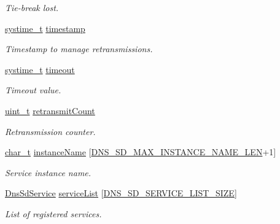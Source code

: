 \begin{DoxyCompactItemize}
\begin{DoxyCompactList}\small\item\em Tie-\/break lost. \end{DoxyCompactList}\item 
\hyperlink{compiler__port_8h_ae3e32a98d431a02106616da3071832dd}{systime\+\_\+t} \hyperlink{struct__DnsSdContext_aec4267367c8b45683171caeaeba3c342}{timestamp}
\begin{DoxyCompactList}\small\item\em Timestamp to manage retransmissions. \end{DoxyCompactList}\item 
\hyperlink{compiler__port_8h_ae3e32a98d431a02106616da3071832dd}{systime\+\_\+t} \hyperlink{struct__DnsSdContext_ab0cfde919cfcd7ebe5d15d2d1effba21}{timeout}
\begin{DoxyCompactList}\small\item\em Timeout value. \end{DoxyCompactList}\item 
\hyperlink{compiler__port_8h_a12a1e9b3ce141648783a82445d02b58d}{uint\+\_\+t} \hyperlink{struct__DnsSdContext_a8dbf8deb74cf7b21692d32ae0378acc0}{retransmit\+Count}
\begin{DoxyCompactList}\small\item\em Retransmission counter. \end{DoxyCompactList}\item 
\hyperlink{compiler__port_8h_a40bb5262bf908c328fbcfbe5d29d0201}{char\+\_\+t} \hyperlink{struct__DnsSdContext_a05168e403e00c734618bc6369e6ad304}{instance\+Name} \mbox{[}\hyperlink{dns__sd_8h_acbbd239513bf1078f6b8b4b7bccff7cf}{D\+N\+S\+\_\+\+S\+D\+\_\+\+M\+A\+X\+\_\+\+I\+N\+S\+T\+A\+N\+C\+E\+\_\+\+N\+A\+M\+E\+\_\+\+L\+EN}+1\mbox{]}
\begin{DoxyCompactList}\small\item\em Service instance name. \end{DoxyCompactList}\item 
\hyperlink{structDnsSdService}{Dns\+Sd\+Service} \hyperlink{struct__DnsSdContext_aaa1a4ec82fd56cbe5cfae79cf6485fd8}{service\+List} \mbox{[}\hyperlink{dns__sd_8h_a561a3da46162838063fd14c5135d01c7}{D\+N\+S\+\_\+\+S\+D\+\_\+\+S\+E\+R\+V\+I\+C\+E\+\_\+\+L\+I\+S\+T\+\_\+\+S\+I\+ZE}\mbox{]}
\begin{DoxyCompactList}\small\item\em List of registered services. \end{DoxyCompactList}\end{DoxyCompactItemize}


